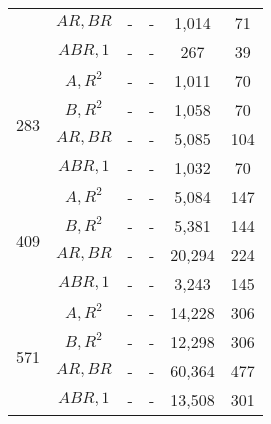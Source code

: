 \begin{table}[H]
\begin{center}
\begin{tabular}{|c|c||c|c||c|c|}
&$AR,BR$     & - & - & 1,014 & 71\\
&$ABR,1$     & - & - & 267   & 39\\
\hline
\multirow{4}{*}{283} &
$A,R^2$      & - & - & 1,011 & 70\\
&$B,R^2$     & - & - & 1,058 & 70\\
&$AR,BR$     & - & - & 5,085 & 104\\
&$ABR,1$     & - & - & 1,032 & 70\\
\hline
\multirow{4}{*}{409} &
$A,R^2$      & - & - & 5,084  & 147\\
&$B,R^2$     & - & - & 5,381  & 144\\
&$AR,BR$     & - & - & 20,294 & 224\\
&$ABR,1$     & - & - & 3,243  & 145\\
\hline
\multirow{4}{*}{571} &
$A,R^2$      & - & - & 14,228 & 306\\
&$B,R^2$     & - & - & 12,298 & 306\\
&$AR,BR$     & - & - & 60,364 & 477\\
&$ABR,1$     & - & - & 13,508 & 301\\
\hline
\end{tabular}
\end{center}
\end{table}
